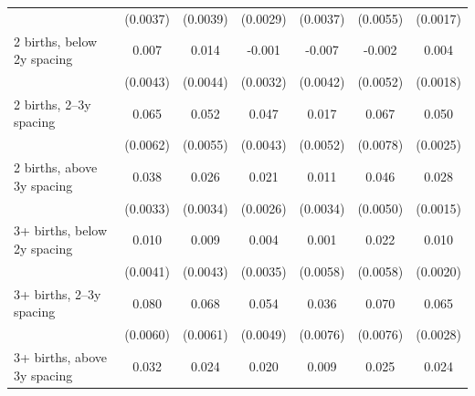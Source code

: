 {\begin{tabular}{l*{6}{c}}
                    &    (0.0037)        &    (0.0039)        &    (0.0029)        &    (0.0037)        &    (0.0055)        &    (0.0017)        \\
\addlinespace
\hspace*{1em}2 births, below 2y spacing&       0.007\sym{*} &       0.014\sym{**}&      -0.001        &      -0.007\sym{*} &      -0.002        &       0.004\sym{*} \\
                    &    (0.0043)        &    (0.0044)        &    (0.0032)        &    (0.0042)        &    (0.0052)        &    (0.0018)        \\
\addlinespace
\hspace*{1em}2 births, 2–3y spacing&       0.065\sym{**}&       0.052\sym{**}&       0.047\sym{**}&       0.017\sym{**}&       0.067\sym{**}&       0.050\sym{**}\\
                    &    (0.0062)        &    (0.0055)        &    (0.0043)        &    (0.0052)        &    (0.0078)        &    (0.0025)        \\
\addlinespace
\hspace*{1em}2 births, above 3y spacing&       0.038\sym{**}&       0.026\sym{**}&       0.021\sym{**}&       0.011\sym{**}&       0.046\sym{**}&       0.028\sym{**}\\
                    &    (0.0033)        &    (0.0034)        &    (0.0026)        &    (0.0034)        &    (0.0050)        &    (0.0015)        \\
\addlinespace
\hspace*{1em}3+ births, below 2y spacing&       0.010\sym{*} &       0.009\sym{*} &       0.004\sym{*} &       0.001        &       0.022\sym{**}&       0.010\sym{**}\\
                    &    (0.0041)        &    (0.0043)        &    (0.0035)        &    (0.0058)        &    (0.0058)        &    (0.0020)        \\
\addlinespace
\hspace*{1em}3+ births, 2–3y spacing&       0.080\sym{**}&       0.068\sym{**}&       0.054\sym{**}&       0.036\sym{**}&       0.070\sym{**}&       0.065\sym{**}\\
                    &    (0.0060)        &    (0.0061)        &    (0.0049)        &    (0.0076)        &    (0.0076)        &    (0.0028)        \\
\addlinespace
\hspace*{1em}3+ births, above 3y spacing&       0.032\sym{**}&       0.024\sym{**}&       0.020\sym{**}&       0.009\sym{**}&       0.025\sym{**}&       0.024\sym{**}\\

\end{tabular}}
